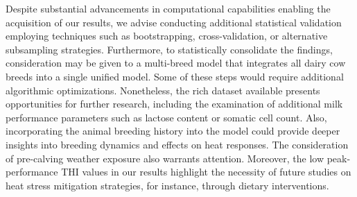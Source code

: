 \vspace*{\baselineskip}
Despite substantial advancements in computational capabilities enabling the acquisition of our results, we advise conducting additional statistical validation employing techniques such as bootstrapping, cross-validation, or alternative subsampling strategies. Furthermore, to statistically consolidate the findings, consideration may be given to a multi-breed model that integrates all dairy cow breeds into a single unified model. Some of these steps would require additional algorithmic optimizations. Nonetheless, the rich dataset available presents opportunities for further research, including the examination of additional milk performance parameters such as lactose content or somatic cell count. Also, incorporating the animal breeding history into the model could provide deeper insights into breeding dynamics and effects on heat responses. The consideration of pre-calving weather exposure also warrants attention. Moreover, the low peak-performance THI values in our results highlight the necessity of future studies on heat stress mitigation strategies, for instance, through dietary interventions.
